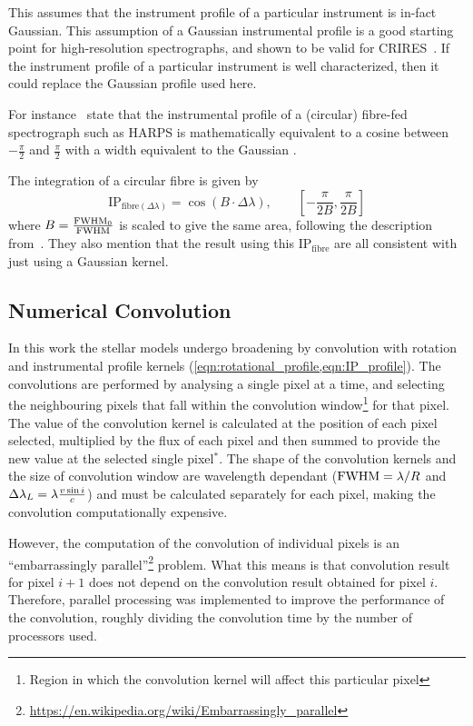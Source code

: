 This assumes that the instrument profile of a particular instrument is in-fact Gaussian.
This assumption of a Gaussian instrumental profile is a good starting point for high-resolution spectrographs, and shown to be valid for CRIRES~\citep{seifahrt_synthesising_2010}.
If the instrument profile of a particular instrument is well characterized, then it could replace the Gaussian profile used here.

For instance~\citet{artigau_optical_2018}  state that the instrumental profile of a (circular) fibre-fed spectrograph such as {HARPS} is mathematically equivalent to a cosine between $-\frac{\pi}{2}$ and $\frac{\pi}{2}$ with a width equivalent to the Gaussian {\fwhm}.

The integration of a circular fibre is given by
\begin{equation}
\textrm{IP}_{\textrm{fibre}(\Delta\lambda)} = \cos(B\cdot\Delta\lambda) ,  \hspace{2em} [-\frac{\pi}{2 B}, \frac{\pi}{2 B}]
\end{equation}
where {$B = \frac{\textrm{FWHM}_{0}}{\textrm{FWHM}}$ } is scaled to give the same area,
following the description from~\citet{artigau_optical_2018}.  They also mention that the result using this $\textrm{IP}_{\textrm{fibre}}$ are all consistent with just using a Gaussian kernel.

\subsection{Numerical Convolution}
\label{subsec:numerical_convolution}
In this work the stellar models undergo broadening by convolution with rotation and instrumental profile kernels (\cref{eqn:rotational_profile,eqn:IP_profile}).
The convolutions are performed by analysing a single pixel at a time, and selecting the neighbouring pixels that fall within the convolution window\footnote{Region in which the convolution kernel will affect this particular pixel} for that pixel.
The value of the convolution kernel is calculated at the position of each pixel selected, multiplied by the flux of each pixel and then summed to provide the new value at the selected single pixel{$^{\textbf{*}}$}.
 The shape of the convolution kernels and the size of convolution window are wavelength dependant (${\textrm{FWHM}}=\lambda / R$ and $\Delta\lambda_{L}=\lambda \frac{v\sin{i}}{c}$) and must be calculated separately for each pixel, making the convolution computationally expensive.

However, the computation of the convolution of individual pixels is an ``embarrassingly parallel''\footnote{\href{https://en.wikipedia.org/wiki/Embarrassingly\_parallel}{https://en.wikipedia.org/wiki/Embarrassingly\_parallel}} problem.
What this means is that convolution result for pixel $i+1$ does not depend on the convolution result obtained for pixel $i$.
Therefore, parallel processing was implemented to improve the performance of the convolution, roughly dividing the convolution time by the number of processors used.

